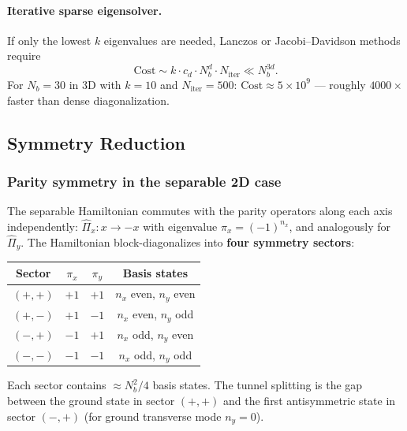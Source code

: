 \paragraph{Iterative sparse eigensolver.}
If only the lowest $k$ eigenvalues are needed, Lanczos or Jacobi--Davidson
methods require
\begin{equation}
    \text{Cost} \sim k \cdot c_d \cdot N_b^d \cdot N_\mathrm{iter}
    \ll N_b^{3d}.
\end{equation}
For $N_b = 30$ in 3D with $k=10$ and $N_\mathrm{iter} = 500$:
$\text{Cost} \approx 5 \times 10^9$ --- roughly $4000\times$ faster than
dense diagonalization.

\subsection{Symmetry Reduction}\label{sec:symmetry_md}

\subsubsection{Parity symmetry in the separable 2D case}

The separable Hamiltonian commutes with the parity operators along each axis
independently: $\hat{\Pi}_x\colon x \to -x$ with eigenvalue
$\pi_x = (-1)^{n_x}$, and analogously for $\hat{\Pi}_y$.  The Hamiltonian
block-diagonalizes into \textbf{four symmetry sectors}:

\begin{center}
\renewcommand{\arraystretch}{1.3}
\begin{tabular}{cccc}
\toprule
Sector & $\pi_x$ & $\pi_y$ & Basis states \\
\midrule
$(+,+)$ & $+1$ & $+1$ & $n_x$ even, $n_y$ even \\
$(+,-)$ & $+1$ & $-1$ & $n_x$ even, $n_y$ odd  \\
$(-,+)$ & $-1$ & $+1$ & $n_x$ odd,  $n_y$ even \\
$(-,-)$ & $-1$ & $-1$ & $n_x$ odd,  $n_y$ odd  \\
\bottomrule
\end{tabular}
\end{center}

Each sector contains $\approx N_b^2/4$ basis states.  The tunnel splitting
is the gap between the ground state in sector $(+,+)$ and the first
antisymmetric state in sector $(-,+)$ (for ground transverse mode $n_y=0$).

